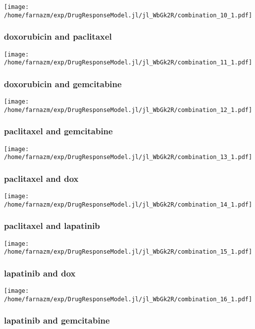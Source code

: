 \documentclass[12pt,a4paper]{article}
\begin{document}
\texttt{[image: /home/farnazm/exp/DrugResponseModel.jl/jl\_WbGk2R/combination\_10\_1.pdf]}

\subsubsection{doxorubicin and paclitaxel}

\texttt{[image: /home/farnazm/exp/DrugResponseModel.jl/jl\_WbGk2R/combination\_11\_1.pdf]}

\subsubsection{doxorubicin and gemcitabine}

\texttt{[image: /home/farnazm/exp/DrugResponseModel.jl/jl\_WbGk2R/combination\_12\_1.pdf]}

\subsubsection{paclitaxel and gemcitabine}

\texttt{[image: /home/farnazm/exp/DrugResponseModel.jl/jl\_WbGk2R/combination\_13\_1.pdf]}

\subsubsection{paclitaxel and dox}

\texttt{[image: /home/farnazm/exp/DrugResponseModel.jl/jl\_WbGk2R/combination\_14\_1.pdf]}

\subsubsection{paclitaxel and lapatinib}

\texttt{[image: /home/farnazm/exp/DrugResponseModel.jl/jl\_WbGk2R/combination\_15\_1.pdf]}

\subsubsection{lapatinib and dox}

\texttt{[image: /home/farnazm/exp/DrugResponseModel.jl/jl\_WbGk2R/combination\_16\_1.pdf]}

\subsubsection{lapatinib and gemcitabine}
\end{document}
